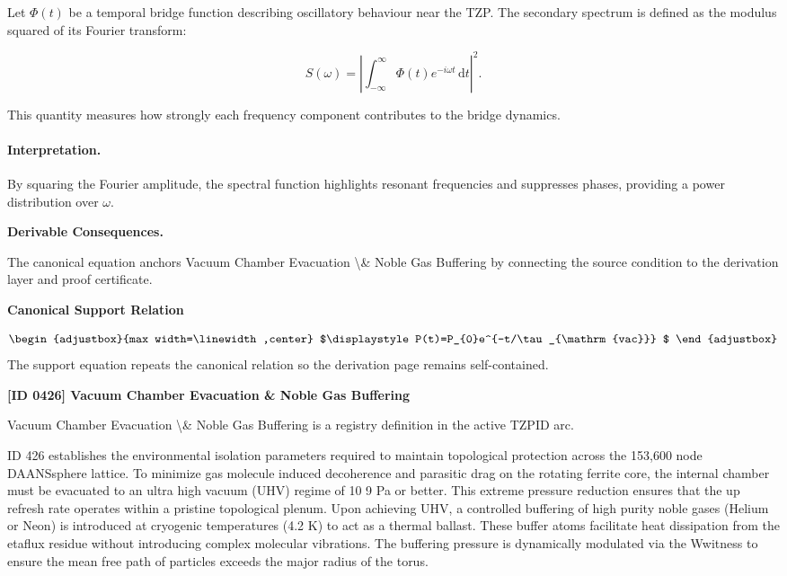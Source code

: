 Let $\Phi(t)$ be a temporal bridge function describing oscillatory behaviour near the TZP.
The secondary spectrum is defined as the modulus squared of its Fourier transform:

\begin{equation}
S(\omega) = \left| \int_{-\infty}^{\infty} \Phi(t) e^{-i\omega t} \, \mathrm{d}t \right|^2 .
\end{equation}

This quantity measures how strongly each frequency component contributes to the bridge dynamics.

\paragraph{Interpretation.}

By squaring the Fourier amplitude, the spectral function highlights resonant frequencies and suppresses phases, providing a power distribution over $\omega$.

\par\vspace{0.35em}
\noindent\textbf{Derivable Consequences.}\quad
\begingroup
\footnotesize
\raggedright
The canonical equation anchors Vacuum Chamber Evacuation \textbackslash{}\& Noble Gas Buffering by connecting the source condition to the derivation layer and proof certificate.
\par\endgroup

\noindent\textbf{Canonical Support Relation}\par
\[
\begin{adjustbox}{max width=\linewidth,center}
$\displaystyle
P(t)=P_{0}e^{-t/\tau_{\mathrm{vac}}}
$
\end{adjustbox}
\]
\noindent The support equation repeats the canonical relation so the derivation page remains self-contained.\par

\clearpage
\noindent\textbf{[ID 0426] Vacuum Chamber Evacuation \& Noble Gas Buffering}\par
\vspace{0.35em}
\begingroup\small
{}
Vacuum Chamber Evacuation \textbackslash{}\& Noble Gas Buffering is a registry definition in the active TZPID arc.

ID 426 establishes the environmental isolation parameters required to maintain topological protection across the 153,600 node DAANSsphere lattice. To minimize gas molecule induced decoherence and parasitic drag on the rotating ferrite core, the internal chamber must be evacuated to an ultra high vacuum (UHV) regime of 10 9 Pa or better. This extreme pressure reduction ensures that the up refresh rate operates within a pristine topological plenum. Upon achieving UHV, a controlled buffering of high purity noble gases (Helium or Neon) is introduced at cryogenic temperatures (4.2 K) to act as a thermal ballast. These buffer atoms facilitate heat dissipation from the etaflux residue without introducing complex molecular vibrations. The buffering pressure is dynamically modulated via the Wwitness to ensure the mean free path of particles exceeds the major radius of the torus.

